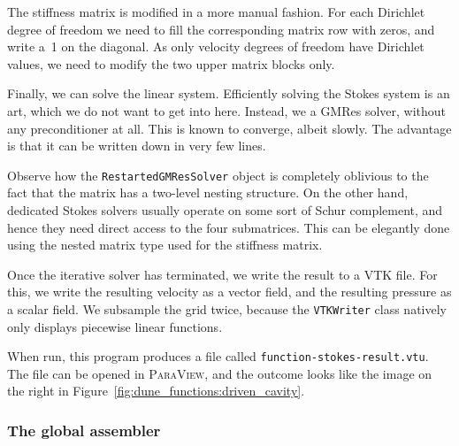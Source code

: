 \documentclass[a4paper,10pt,headings=normal,bibliography=totoc]{scrartcl}
\newcommand{\cpp}[1]{\lstinline[basicstyle=\ttfamily]!#1!}
\newcommand{\program}[1]{\textsc{#1}\xspace}
\newcommand{\file}[1]{\texttt{#1}}
\begin{document}
The stiffness matrix is modified in a more manual fashion.  For each Dirichlet degree of freedom we need to fill the corresponding matrix row
with zeros, and write a~1 on the diagonal.  As only velocity
degrees of freedom have Dirichlet values, we need to modify the two upper matrix blocks only.
%

%
Finally, we can solve the linear system.  Efficiently solving the Stokes system is an art, which we do not want to
get into here.  Instead, we a GMRes solver, without any preconditioner at all.  This is known to converge,
albeit slowly.
The advantage is that it can be written down in very few lines.
%

%
Observe how the \cpp{RestartedGMResSolver} object is completely oblivious to the fact that the matrix
has a two-level nesting structure.  On the other hand, dedicated Stokes solvers usually operate
on some sort of Schur complement, and hence they need direct access
to the four submatrices.  This can be elegantly done using the nested matrix type
used for the stiffness matrix.

Once the iterative solver has terminated, we write the result to a VTK file.  For this, we write the resulting velocity as a vector field,
and the resulting pressure as a scalar field.  We subsample the grid twice, because the \cpp{VTKWriter}
class natively only displays piecewise linear functions.
%

%
When run, this program produces a file called \file{function-stokes-result.vtu}.  The file can be opened in
\program{ParaView}, and the outcome looks like the image on the right in Figure~\ref{fig:dune_functions:driven_cavity}.

\subsubsection{The global assembler}
\end{document}
